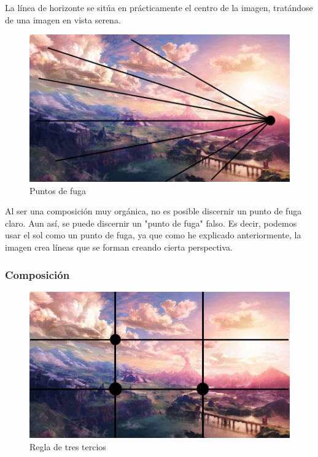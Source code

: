 \documentclass[12pt]{article}
\begin{document}
        La línea de horizonte se sitúa en prácticamente el centro de la imagen, tratándose de una imagen en vista serena. 

        \newpage

        \begin{figure}[H]
          \centering
          \includegraphics[width=\textwidth]{images/Jesus/Seccion2/Group 3.JPEG}
          \caption{Puntos de fuga}
        \end{figure}
        Al ser una composición muy orgánica, no es posible discernir un punto de fuga claro. Aun así, se puede discernir un "punto de fuga" falso. Es decir, podemos usar el sol como un punto de fuga, ya que como he explicado anteriormente, la imagen crea líneas que se forman creando cierta perspectiva.

        \newpage

        
        \subsubsection{Composición}
        
          \begin{figure}[H]
            \centering
            \includegraphics[width=\textwidth]{images/Jesus/Seccion2/Group 1.JPEG}
            \caption{Regla de tres tercios}
          \end{figure}
          
\end{document}
